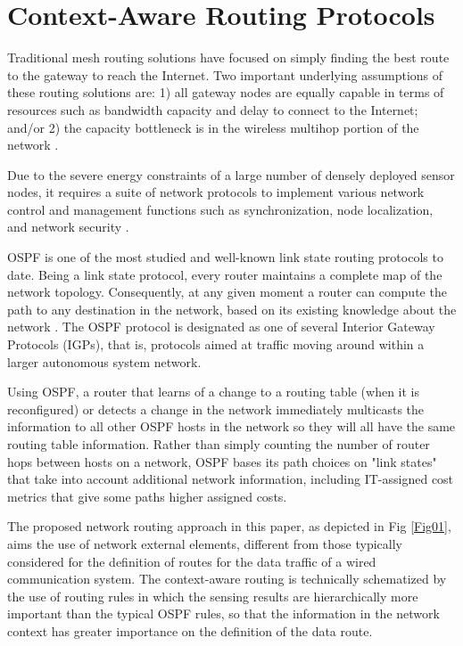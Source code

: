 \section{Context-Aware Routing Protocols}


Traditional mesh routing solutions have focused on simply finding the best route to the gateway to reach the Internet. Two important underlying assumptions of these routing solutions are: 1) all gateway nodes are equally capable in terms of resources such as bandwidth capacity and delay to connect to the Internet; and/or 2) the capacity bottleneck is in the wireless multihop portion of the network \cite{Prashanth2015}.

Due to the severe energy constraints of a large number of densely deployed sensor nodes, it requires a suite of network protocols to implement various network control and management functions such as synchronization, node localization, and network security \cite{Shio2010}.

OSPF is one of the most studied and well-known link state routing protocols to date. Being a link state protocol, every router maintains a complete map of the network topology. Consequently, at any given moment a router can compute the path to any destination in the network, based on its existing knowledge about the network \cite{Holter2010}. The OSPF protocol is designated as one of several Interior Gateway Protocols (IGPs), that is, protocols aimed at traffic moving around within a larger autonomous system network.

Using OSPF, a router that learns of a change to a routing table (when it is reconfigured) or detects a change in the network immediately multicasts the information to all other OSPF hosts in the network so they will all have the same routing table information. Rather than simply counting the number of router hops between hosts on a network, OSPF bases its path choices on "link states" that take into account additional network information, including IT-assigned cost metrics that give some paths higher assigned costs.

The proposed network routing approach in this paper, as depicted in Fig \ref{Fig01},  aims the use of network external elements, different from those typically considered for the definition of routes for the data traffic of a wired communication system. The context-aware routing is technically schematized by the use of routing rules in which the sensing results are hierarchically more important than the typical OSPF rules, so that the information in the network context has greater importance on the definition of the data route.

